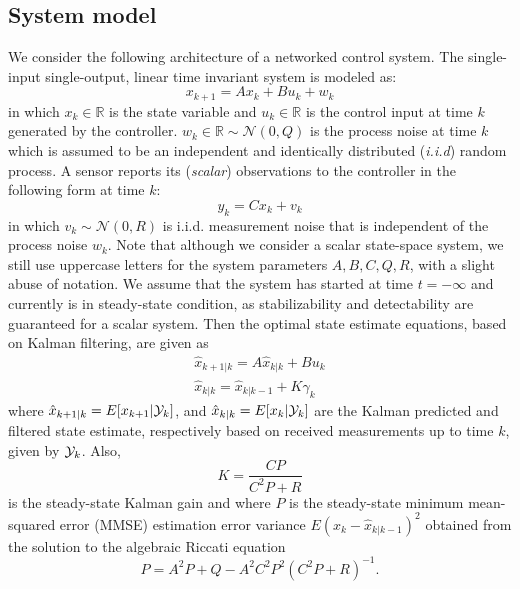 \documentclass[journal,10pt]{IEEEtran}
\begin{document}
\subsection{System model}
\noindent We consider the following 
architecture of a networked control system.
 The single-input single-output, linear time invariant system is
modeled as:
\begin{equation}
x_{k+1}=Ax_{k}+Bu_{k}+w_{k}\label{syseq}
\end{equation}
in which $x_{k}\in \mathbb{R}$  is the state variable and $u_{k}\in
\mathbb{R}$ is the control input at time $k$ generated by the
controller. $w_{k}\in \mathbb{R}\sim\mathcal{N}(0,Q)$ is the process
noise at time $k$ which is assumed to be an independent and identically distributed ({\em i.i.d}) random process.
A sensor reports its ({\em scalar}) observations to the controller  in the
following form at time $k$:
\begin{equation}
y_{k}=Cx_{k}+v_{k}\label{ydef}
\end{equation}
in which $v_{k}\sim \mathcal{N}(0,R)$ is i.i.d. measurement noise
that is independent of the process noise $w_{k}$. Note that although we consider a scalar state-space system, we still use uppercase letters for the system parameters $A, B, C, Q, R$, with a slight abuse of notation. We assume that the
system has started at time $t = -\infty$ and currently is in
steady-state condition, as stabilizability and detectability are guaranteed for a scalar system. Then the optimal state estimate equations, based
on Kalman filtering, are given as
\begin{eqnarray}
\hat{x}_{k+1|k}=A\hat{x}_{k|k}+Bu_{k}\\
\hat{x}_{k|k}=\hat{x}_{k|k-1}+K\gamma_{k}\label{xestimatedef}
\end{eqnarray}
where $\hat x_{k+1|k} = E[x_{k+1} |{\cal Y}_k]$, and $\hat x_{k|k} = E[x_k | {\cal Y}_k]$ are the Kalman predicted and filtered state estimate, respectively based on received measurements up to time $k$, given by ${\cal Y}_k$. Also, 
\begin{equation}
K=\frac{CP}{C^{2}P+R}
\end{equation}
is the steady-state Kalman gain
and where $P$ is the steady-state minimum mean-squared error (MMSE) estimation error variance
$E(x_{k}-\hat{x}_{k|k-1})^{2}$ obtained from the solution to the algebraic Riccati
equation
\begin{equation}
P=A^{2}P+Q-A^{2}C^{2}P^{2}(C^{2}P+R)^{-1}.\label{MMSE}
\end{equation}
\end{document}
